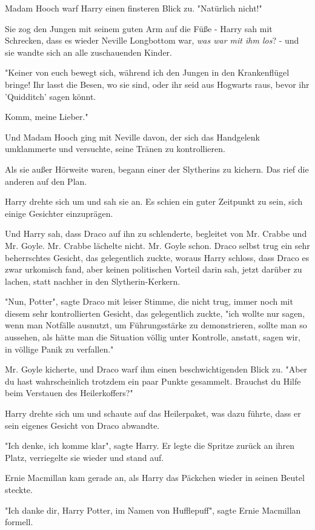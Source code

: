 {Madam Hooch warf Harry einen finsteren Blick zu. "Natürlich nicht!"

Sie zog den Jungen mit seinem guten Arm auf die Füße - Harry sah mit Schrecken, dass es wieder Neville Longbottom war, \emph{was war mit ihm los}? - und sie wandte sich an alle zuschauenden Kinder.

"Keiner von euch bewegt sich, während ich den Jungen in den Krankenflügel bringe! Ihr lasst die Besen, wo sie sind, oder ihr seid aus Hogwarts raus, bevor ihr 'Quidditch' sagen könnt.

Komm, meine Lieber."

Und Madam Hooch ging mit Neville davon, der sich das Handgelenk umklammerte und versuchte, seine Tränen zu kontrollieren.

Als sie außer Hörweite waren, begann einer der Slytherins zu kichern. Das rief die anderen auf den Plan.

Harry drehte sich um und sah sie an. Es schien ein guter Zeitpunkt zu sein, sich einige Gesichter einzuprägen.

Und Harry sah, dass Draco auf ihn zu schlenderte, begleitet von Mr. Crabbe und Mr. Goyle. Mr. Crabbe lächelte nicht. Mr. Goyle schon. Draco selbst trug ein sehr beherrschtes Gesicht, das gelegentlich zuckte, woraus Harry schloss, dass Draco es zwar urkomisch fand, aber keinen politischen Vorteil darin sah, jetzt darüber zu lachen, statt nachher in den Slytherin-Kerkern.

"Nun, Potter", sagte Draco mit leiser Stimme, die nicht trug, immer noch mit diesem sehr kontrollierten Gesicht, das gelegentlich zuckte, "ich wollte nur sagen, wenn man Notfälle ausnutzt, um Führungsstärke zu demonstrieren, sollte man so aussehen, als hätte man die Situation völlig unter Kontrolle, anstatt, sagen wir, in völlige Panik zu verfallen."

Mr. Goyle kicherte, und Draco warf ihm einen beschwichtigenden Blick zu. "Aber du hast wahrscheinlich trotzdem ein paar Punkte gesammelt. Brauchst du Hilfe beim Verstauen des Heilerkoffers?"

Harry drehte sich um und schaute auf das Heilerpaket, was dazu führte, dass er sein eigenes Gesicht von Draco abwandte.

"Ich denke, ich komme klar", sagte Harry. Er legte die Spritze zurück an ihren Platz, verriegelte sie wieder und stand auf.

Ernie Macmillan kam gerade an, als Harry das Päckchen wieder in seinen Beutel steckte.

"Ich danke dir, Harry Potter, im Namen von Hufflepuff", sagte Ernie Macmillan formell.

}
